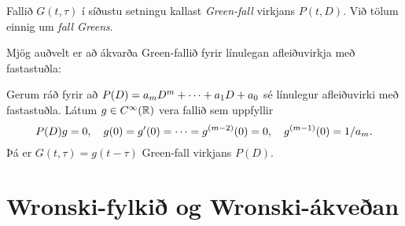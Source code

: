 \begin{sk} Fallið $G(t,\tau)$ í síðustu setningu kallast {\it
Green-fall}
virkjans $P(t,D)$.
 Við tölum einnig um {\it fall Greens}.
\end{sk}

Mjög auðvelt er að ákvarða Green-fallið fyrir línulegan 
afleiðuvirkja með fasta\-stuðla:

\begin{fs}  Gerum ráð fyrir að 
$P(D)=a_mD\sp m+\cdots+a_1D+a_0$ sé línulegur afleiðuvirki með
fastastuðla.  Látum $g\in C\sp{\infty}({\mathbb R})$ vera fallið sem uppfyllir
 \begin{equation*}P(D)g=0, \quad g(0)=g{\sp{\prime}}(0)=\cdots=g^{(m-2)}(0)=0, \quad
g^{(m-1)}(0)=1/a_m.\label{2.5.9}
 \end{equation*}
Þá er $G(t,\tau)=g(t-\tau)$  Green-fall virkjans $P(D)$.
\end{fs}


\section{Wronski-fylkið og
Wronski-ákveðan}

